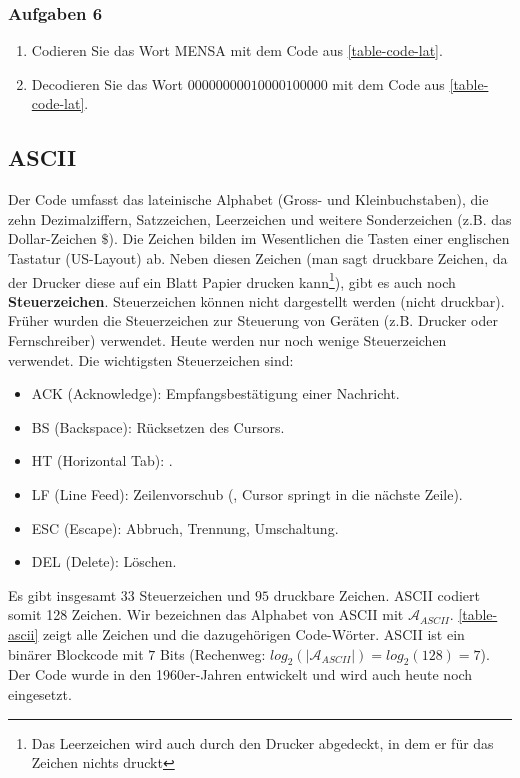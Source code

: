 \subsubsection{Aufgaben 6}

\begin{enumerate}
\item Codieren Sie das Wort MENSA mit dem Code aus \autoref{table-code-lat}.
\item Decodieren Sie das Wort $00000000010000100000$ mit dem Code aus \autoref{table-code-lat}.
\end{enumerate}

\subsection{\acs{ASCII}}

Der Code umfasst das lateinische Alphabet (Gross- und Kleinbuchstaben), die zehn Dezimalziffern, Satzzeichen, Leerzeichen und weitere Sonderzeichen (z.B. das Dollar-Zeichen $\$$). Die Zeichen bilden im Wesentlichen die Tasten einer englischen Tastatur (US-Layout) ab. Neben diesen  Zeichen (man sagt druckbare Zeichen, da der Drucker diese auf ein Blatt Papier drucken kann\footnote{Das Leerzeichen wird auch durch den Drucker abgedeckt, in dem er für das Zeichen nichts druckt}), gibt es auch noch \textbf{Steuerzeichen}. Steuerzeichen können nicht dargestellt werden (nicht druckbar). Früher wurden die Steuerzeichen zur Steuerung von Geräten (z.B. Drucker oder Fernschreiber) verwendet. Heute werden nur noch wenige Steuerzeichen verwendet. Die wichtigsten Steuerzeichen sind:

\begin{itemize}
\item ACK (Acknowledge): Empfangsbestätigung einer Nachricht.
\item BS (Backspace): Rücksetzen des Cursors.
\item HT (Horizontal Tab): .
\item LF (Line Feed): Zeilenvorschub (, Cursor springt in die nächste Zeile).
\item ESC (Escape): Abbruch, Trennung, Umschaltung.
\item DEL (Delete): Löschen.
\end{itemize}

Es gibt insgesamt $33$ Steuerzeichen und $95$ druckbare Zeichen. \ac{ASCII} codiert somit 128 Zeichen. Wir bezeichnen das Alphabet von \ac{ASCII} mit $\mathscr{A}_{ASCII}$. \autoref{table-ascii} zeigt alle Zeichen und die dazugehörigen Code-Wörter. \ac{ASCII} ist ein binärer Blockcode mit $7$ Bits (Rechenweg: $log_2(|\mathscr{A}_{ASCII}|)=log_2(128)=7$). Der Code wurde in den 1960er-Jahren entwickelt und wird auch heute noch eingesetzt.

